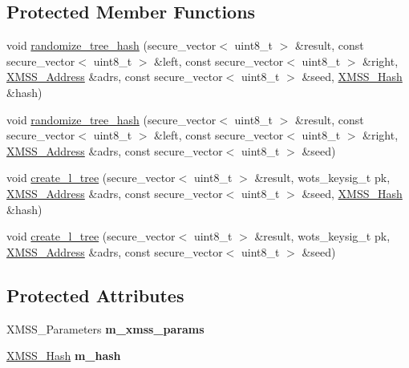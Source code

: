 \subsection*{Protected Member Functions}
\begin{DoxyCompactItemize}
\item 
void \mbox{\hyperlink{class_botan_1_1_x_m_s_s___common___ops_a5d08646c7fbf2462ecea2e204ca63d8f}{randomize\+\_\+tree\+\_\+hash}} (secure\+\_\+vector$<$ uint8\+\_\+t $>$ \&result, const secure\+\_\+vector$<$ uint8\+\_\+t $>$ \&left, const secure\+\_\+vector$<$ uint8\+\_\+t $>$ \&right, \mbox{\hyperlink{class_botan_1_1_x_m_s_s___address}{X\+M\+S\+S\+\_\+\+Address}} \&adrs, const secure\+\_\+vector$<$ uint8\+\_\+t $>$ \&seed, \mbox{\hyperlink{class_botan_1_1_x_m_s_s___hash}{X\+M\+S\+S\+\_\+\+Hash}} \&hash)
\item 
void \mbox{\hyperlink{class_botan_1_1_x_m_s_s___common___ops_ac2b7faff80249b5ddcd32eb634bb20f8}{randomize\+\_\+tree\+\_\+hash}} (secure\+\_\+vector$<$ uint8\+\_\+t $>$ \&result, const secure\+\_\+vector$<$ uint8\+\_\+t $>$ \&left, const secure\+\_\+vector$<$ uint8\+\_\+t $>$ \&right, \mbox{\hyperlink{class_botan_1_1_x_m_s_s___address}{X\+M\+S\+S\+\_\+\+Address}} \&adrs, const secure\+\_\+vector$<$ uint8\+\_\+t $>$ \&seed)
\item 
void \mbox{\hyperlink{class_botan_1_1_x_m_s_s___common___ops_a9c24984fc8983bab2106a3e702d02c91}{create\+\_\+l\+\_\+tree}} (secure\+\_\+vector$<$ uint8\+\_\+t $>$ \&result, wots\+\_\+keysig\+\_\+t pk, \mbox{\hyperlink{class_botan_1_1_x_m_s_s___address}{X\+M\+S\+S\+\_\+\+Address}} \&adrs, const secure\+\_\+vector$<$ uint8\+\_\+t $>$ \&seed, \mbox{\hyperlink{class_botan_1_1_x_m_s_s___hash}{X\+M\+S\+S\+\_\+\+Hash}} \&hash)
\item 
void \mbox{\hyperlink{class_botan_1_1_x_m_s_s___common___ops_a45991edc4a92109d244554308f0fa051}{create\+\_\+l\+\_\+tree}} (secure\+\_\+vector$<$ uint8\+\_\+t $>$ \&result, wots\+\_\+keysig\+\_\+t pk, \mbox{\hyperlink{class_botan_1_1_x_m_s_s___address}{X\+M\+S\+S\+\_\+\+Address}} \&adrs, const secure\+\_\+vector$<$ uint8\+\_\+t $>$ \&seed)
\end{DoxyCompactItemize}
\subsection*{Protected Attributes}
\begin{DoxyCompactItemize}
\item 
\mbox{\label{class_botan_1_1_x_m_s_s___common___ops_a2ab57893ec6edbf79546a25ab5379c2e}} 
X\+M\+S\+S\+\_\+\+Parameters {\bfseries m\+\_\+xmss\+\_\+params}
\item 
\mbox{\label{class_botan_1_1_x_m_s_s___common___ops_a0a2b4ada89acec57b4c05125ca79e0b9}} 
\mbox{\hyperlink{class_botan_1_1_x_m_s_s___hash}{X\+M\+S\+S\+\_\+\+Hash}} {\bfseries m\+\_\+hash}
\end{DoxyCompactItemize}



